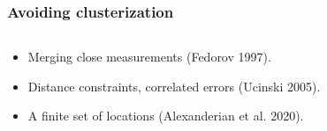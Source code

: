 \documentclass{beamer}
\begin{document}
\begin{frame}
  \frametitle{Avoiding clusterization}

  \begin{columns}
    \begin{column}{0.6\textwidth}
      \begin{itemize}
      \item<1> Merging close measurements (Fedorov 1997).
      \item<2> Distance constraints, correlated errors (Ucinski 2005).
      \item<3> A finite set of locations (Alexanderian et al. 2020).
      \end{itemize}
    \end{column}
    \begin{column}{0.55\textwidth}

\end{column}
\end{columns}
\end{frame}
\end{document}
